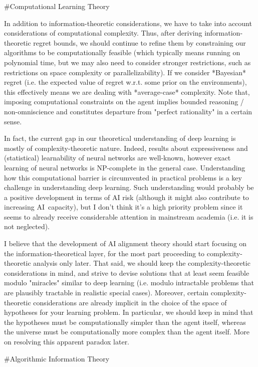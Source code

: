 \documentclass[a4paper]{article}
\begin{document}
\#Computational Learning Theory

In addition to information-theoretic considerations, we have to take into account considerations of computational complexity. Thus, after deriving information-theoretic regret bounds, we should continue to refine them by constraining our algorithms to be computationally feasible (which typically means running on polynomial time, but we may also need to consider stronger restrictions, such as restrictions on space complexity or parallelizability). If we consider *Bayesian* regret (i.e. the expected value of regret w.r.t. some prior on the environments), this effectively means we are dealing with *average-case* complexity. Note that, imposing computational constraints on the agent implies bounded reasoning / non-omniscience and constitutes departure from "perfect rationality" in a certain sense.

In fact, the current gap in our theoretical understanding of deep learning is mostly of complexity-theoretic nature. Indeed, results about expressiveness and (statistical) learnability of neural networks are well-known, however exact learning of neural networks is NP-complete in the general case. Understanding how this computational barrier is circumvented in practical problems is a key challenge in understanding deep learning. Such understanding would probably be a positive development in terms of AI risk (although it might also contribute to increasing AI\ capacity), but I don't think it's a high priority problem since it seems to already receive considerable attention in mainstream academia (i.e. it is not neglected).

I believe that the development of AI alignment theory should start focusing on the information-theoretical layer, for the most part proceeding to complexity-theoretic analysis only later. That said, we should keep the complexity-theoretic considerations in mind, and strive to devise solutions that at least seem feasible modulo "miracles" similar to deep learning (i.e. modulo intractable problems that are plausibly tractable in realistic special cases). Moreover, certain complexity-theoretic considerations are already implicit in the choice of the space of hypotheses for your learning problem. In particular, we should keep in mind that the hypotheses must be computationally simpler than the agent itself, whereas the universe must be computationally more complex than the agent itself. More on resolving this apparent paradox later.

\#Algorithmic Information Theory
\end{document}

